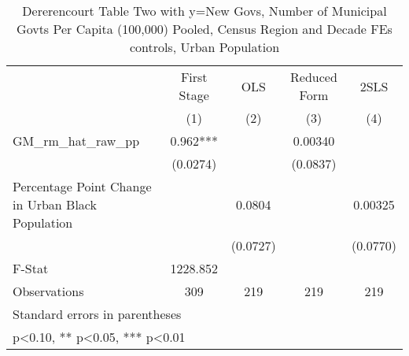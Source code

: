 \begin{table}[htbp]\centering
\def\sym#1{\ifmmode^{#1}\else\(^{#1}\)\fi}
\caption{Dererencourt Table Two with y=New Govs, Number of Municipal Govts Per Capita (100,000) Pooled, Census Region and Decade FEs controls, Urban Population}
\begin{tabular}{l*{4}{c}}
\toprule
                    & First Stage   &         OLS   &Reduced Form   &        2SLS   \\
                    &\multicolumn{1}{c}{(1)}   &\multicolumn{1}{c}{(2)}   &\multicolumn{1}{c}{(3)}   &\multicolumn{1}{c}{(4)}   \\
\midrule
GM\_rm\_hat\_raw\_pp    &       0.962***&               &     0.00340   &               \\
                    &    (0.0274)   &               &    (0.0837)   &               \\
\addlinespace
Percentage Point Change in Urban Black Population&               &      0.0804   &               &     0.00325   \\
                    &               &    (0.0727)   &               &    (0.0770)   \\
\midrule
F-Stat              &    1228.852   &               &               &               \\
Observations        &         309   &         219   &         219   &         219   \\
\bottomrule
\multicolumn{5}{l}{\footnotesize Standard errors in parentheses}\\
\multicolumn{5}{l}{\footnotesize * p<0.10, ** p<0.05, *** p<0.01}\\
\end{tabular}
\end{table}
